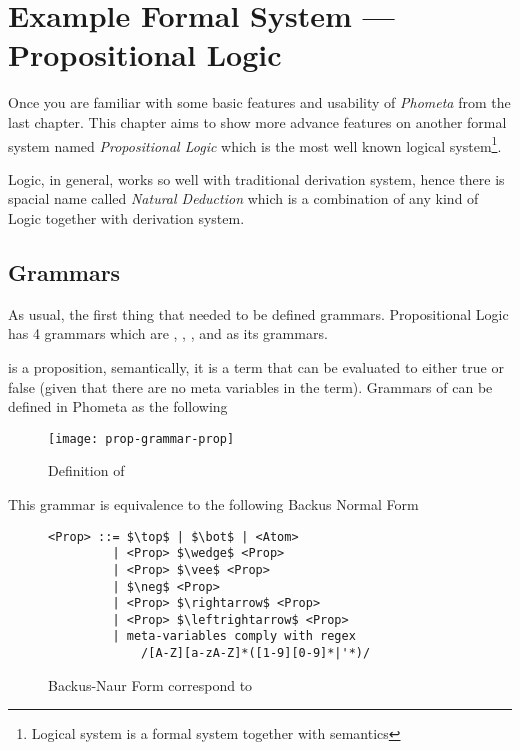 \documentclass[master.tex]{subfiles}
\begin{document}
\chapter{Example Formal System --- Propositional Logic}
\label{chap:example_propositional_logic}

Once you are familiar with some basic features and usability of \emph{Phometa}
from the last chapter. This chapter aims to show more advance features on
another formal system named \emph{Propositional Logic} which is the most well
known logical system\footnote{Logical system is a formal system together with
  semantics\supercite{formal-system-wiki}}.

Logic, in general, works so well with traditional derivation system, hence there
is spacial name called \emph{Natural Deduction} which is a combination of any
kind of Logic together with derivation system.

\section{Grammars}

As usual, the first thing that needed to be defined grammars. Propositional
Logic has 4 grammars which are , ,
, and  as its grammars.

 is a proposition, semantically, it is a term that can be evaluated
to either true or false (given that there are no meta variables in the term).
Grammars of  can be defined in Phometa as the following

\begin{figure}[H]
    \centering
\begin{minipage}{0.7\textwidth}
    \texttt{[image: prop-grammar-prop]}
\end{minipage}
\caption{Definition of }
\label{fig:prop-grammar-prop}
\end{figure}

This grammar is equivalence to the following Backus Normal Form

\begin{figure}[H]
\begin{framed}
\begin{lstlisting}[style=bnf]
<Prop> ::= $\top$ | $\bot$ | <Atom>
         | <Prop> $\wedge$ <Prop>
         | <Prop> $\vee$ <Prop>
         | $\neg$ <Prop>
         | <Prop> $\rightarrow$ <Prop>
         | <Prop> $\leftrightarrow$ <Prop>
         | meta-variables comply with regex
             /[A-Z][a-zA-Z]*([1-9][0-9]*|'*)/
\end{lstlisting}
\end{framed}
\caption{Backus-Naur Form correspond to }
\label{fig:prop-bnf-prop}
\end{figure}
\end{document}
